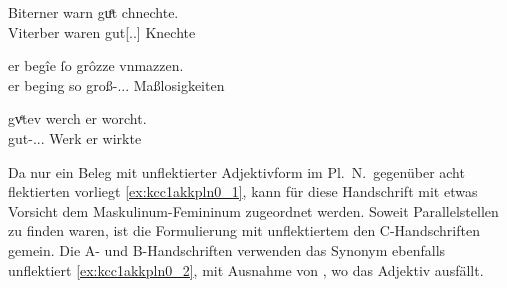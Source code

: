 \begin{exe}
\ex \label{ex:kcc1regel}
	\begin{xlist}
	\ex \label{ex:kcc1regel_1}
		\gll Biterner warn guͤt chnechte. \\
			Viterber waren gut[\Nom.\Pl.\MascM] Knechte \\
		\begin{taggedline}{\parencites[\pno~23\vb, 33]{kc:C1}[vgl.][4383]{schroeder1895}}
		\trans {}
		\end{taggedline}

	\ex \label{ex:kcc1regel_2}
		\gll er begîe ſo grôzze vnmazzen. \\
			er beging so groß-\Acc.\Pl.\FemI.\St{} Maßlosigkeiten \\
		\begin{taggedline}{\parencites[\pno~7\ra, 18]{kc:C1}[vgl.][1286]{schroeder1895}}
		\trans {}
		\end{taggedline}

	\ex \label{ex:kcc1regel_3}
		\gll gvͤtev werch er worcht. \\
			gut-\Acc.\Pl.\NeutI.\St{} Werk er wirkte \\
		\begin{taggedline}{\parencites[\pno~68\vb, 2]{kc:C1}[vgl.][13072]{schroeder1895}}
		\trans {}
		\end{taggedline}
	\end{xlist}
\end{exe}

Da nur ein Beleg mit unflektierter Adjektivform im Pl.~N.\ gegenüber
acht flektierten vorliegt \cref{ex:kcc1akkpln0_1}, kann  für diese
Handschrift mit etwas Vorsicht dem Maskulinum-Femininum zugeordnet werden.
Soweit Parallelstellen zu finden waren, ist die Formulierung mit unflektiertem
  den C-Handschriften gemein. Die A- und B-Handschriften
verwenden das Synonym   ebenfalls unflektiert
\cref{ex:kcc1akkpln0_2}, mit Ausnahme von \citet{kc:VB}, wo das Adjektiv
ausfällt.

